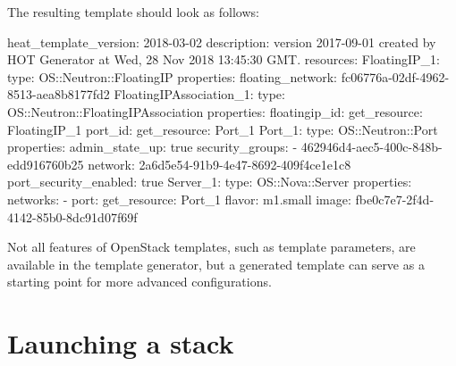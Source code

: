 The resulting template should look as follows:

\begin{code}{}
heat_template_version: 2018-03-02
description: version 2017-09-01 created by HOT Generator at Wed, 28 Nov 2018 13:45:30 GMT.
resources: 
  FloatingIP_1: 
    type: OS::Neutron::FloatingIP
    properties: 
      floating_network: fc06776a-02df-4962-8513-aea8b8177fd2
  FloatingIPAssociation_1: 
    type: OS::Neutron::FloatingIPAssociation
    properties: 
      floatingip_id: { get_resource: FloatingIP_1 }
      port_id: { get_resource: Port_1 }
  Port_1: 
    type: OS::Neutron::Port
    properties: 
      admin_state_up: true
      security_groups: 
        - 462946d4-aec5-400c-848b-edd916760b25
      network: 2a6d5e54-91b9-4e47-8692-409f4ce1e1c8
      port_security_enabled: true
  Server_1: 
    type: OS::Nova::Server
    properties: 
      networks: 
        - port: { get_resource: Port_1 }
      flavor: m1.small
      image: fbe0c7e7-2f4d-4142-85b0-8dc91d07f69f
\end{code}

Not all features of OpenStack templates, such as template parameters, are available in the template generator, but a generated template can serve as a starting point for more advanced configurations.

\section{Launching a stack}

